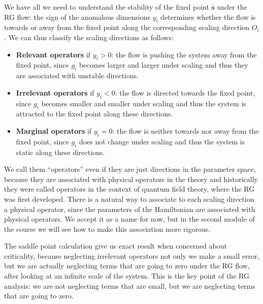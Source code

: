 We have all we need to understand the stability of the fixed point \(\overline{\mathbf{s}}\) under the RG flow: the sign of the anomalous dimensions \(y_i\) determines whether the flow is towards or away from the fixed point along the corresponding scaling direction \(O_i\). We can thus classify the scaling directions as follows:
\begin{itemize}
    \item \textbf{Relevant operators} if \(y_i > 0\): the flow is pushing the system away from the fixed point, since \(g_i\) becomes larger and larger under scaling and thus they are associated with unstable directions.
    \item \textbf{Irrelevant operators} if \(y_i < 0\): the flow is directed towards the fixed point, since \(g_i\) becomes smaller and smaller under scaling and thus the system is attracted to the fixed point along these directions.
    \item \textbf{Marginal operators} if \(y_i = 0\): the flow is neither towards nor away from the fixed point, since \(g_i\) does not change under scaling and thus the system is static along these directions.
\end{itemize}
We call them ``operators'' even if they are just directions in the parameter space, because they are associated with physical operators in the theory and historically they were called operators in the context of quantum field theory, where the RG was first developed. There is a natural way to associate to each scaling direction a physical operator, since the parameters of the Hamiltonian are associated with physical operators. We accept it as a name for now, but in the second module of the course we will see how to make this association more rigorous.

The saddle point calculation give us exact result when concerned about criticality, because neglecting irrelevant operators not only we make a small error, but we are actually neglecting terms that are going to zero under the RG flow, after looking at an infinite scale of the system. This is the key point of the RG analysis: we are not neglecting terms that are small, but we are neglecting terms that are going to zero.

